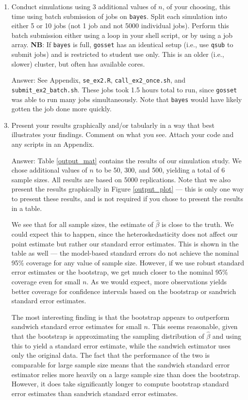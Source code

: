 \documentclass{article}
\begin{document}
\begin{enumerate}
\item Conduct simulations using 3 additional values of $n$, of your choosing, this time using batch submission of jobs on \texttt{bayes}. Split each simulation into either 5 or 10 jobs (not 1 job and not 5000 individual jobs). Perform this batch submission either using a loop in your shell script, or by using a job array. \textbf{NB}: If \texttt{bayes} is full, \texttt{gosset} has an identical setup (i.e., use \texttt{qsub} to submit jobs) and is restricted to student use only. This is an older (i.e., slower) cluster, but often has available cores.

\item[Answer:] See Appendix, \texttt{se\_ex2.R}, \texttt{call\_ex2\_once.sh}, and \texttt{submit\_ex2\_batch.sh}. These jobs took 1.5 hours total to run, since \texttt{gosset} was able to run many jobs simultaneously. Note that \texttt{bayes} would have likely gotten the job done more quickly.

\item Present your results graphically and/or tabularly in a way that best illustrates your findings. Comment on what you see. Attach your code and any scripts in an Appendix.

\item[Answer:] Table \ref{output_mat} contains the results of our simulation study. We chose additional values of $n$ to be 50, 300, and 500, yielding a total of 6 sample sizes. All results are based on 5000 replications. Note that we also present the results graphically in Figure \ref{output_plot} --- this is only one way to present these results, and is not required if you chose to present the results in a table. 

We see that for all sample sizes, the estimate of $\hat{\beta}$ is close to the truth. We could expect this to happen, since the heteroskedasticity does not affect our point estimate but rather our standard error estimates. This is shown in the table as well --- the model-based standard errors do not achieve the nominal 95\% coverage for any value of sample size. However, if we use robust standard error estimates or the bootstrap, we get much closer to the nominal 95\% coverage even for small $n$. As we would expect, more observations yields better coverage for confidence intervals based on the bootstrap or sandwich standard error estimates. 

The most interesting finding is that the bootstrap appears to outperform sandwich standard error estimates for small $n$. This seems reasonable, given that the bootstrap is approximating the sampling distribution of $\hat{\beta}$ and using this to yield a standard error estimate, while the sandwich estimator uses only the original data. The fact that the performance of the two is comparable for large sample size means that the sandwich standard error estimator relies more heavily on a large sample size than does the bootstrap. However, it does take significantly longer to compute bootstrap standard error estimates than sandwich standard error estimates.


\end{enumerate}
\end{document}
